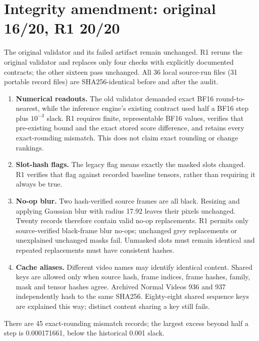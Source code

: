 \documentclass[10pt]{article}
\begin{document}
\section{Integrity amendment: original 16/20, R1 20/20}
The original validator and its failed artifact remain unchanged. R1 reruns the original validator and replaces only four checks with explicitly documented contracts; the other sixteen pass unchanged. All 36 local source-run files (31 portable record files) are SHA256-identical before and after the audit.
\begin{enumerate}
\item \textbf{Numerical readouts.} The old validator demanded exact BF16 round-to-nearest, while the inference engine's existing contract used half a BF16 step plus $10^{-3}$ slack. R1 requires finite, representable BF16 values, verifies that pre-existing bound and the exact stored score difference, and retains every exact-rounding mismatch. This does not claim exact rounding or change rankings.
\item \textbf{Slot-hash flags.} The legacy flag means exactly the masked slots changed. R1 verifies that flag against recorded baseline tensors, rather than requiring it always be true.
\item \textbf{No-op blur.} Two hash-verified source frames are all black. Resizing and applying Gaussian blur with radius 17.92 leaves their pixels unchanged. Twenty records therefore contain valid no-op replacements. R1 permits only source-verified black-frame blur no-ops; unchanged grey replacements or unexplained unchanged masks fail. Unmasked slots must remain identical and repeated replacements must have consistent hashes.
\item \textbf{Cache aliases.} Different video names may identify identical content. Shared keys are allowed only when source hash, frame indices, frame hashes, family, mask and tensor hashes agree. Archived Normal Videos 936 and 937 independently hash to the same SHA256. Eighty-eight shared sequence keys are explained this way; distinct content sharing a key still fails.
\end{enumerate}
There are 45 exact-rounding mismatch records; the largest excess beyond half a step is 0.000171661, below the historical 0.001 slack.
\end{document}
